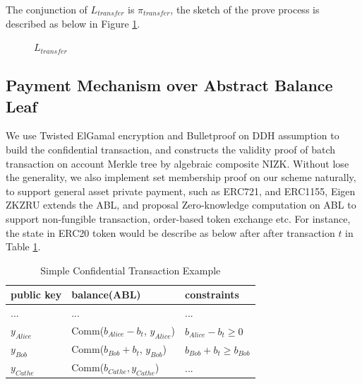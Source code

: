\documentclass{article}
\begin{document}
The conjunction of $L_{transfer}$ is $\pi_{transfer}$, the sketch of the prove process is described as below in Figure \ref{fig:pi_transfer}.
\begin{figure}[H]
    \centering
    \caption{${L_{transfer}}$}
    \label{fig:pi_transfer}
\end{figure}

\subsection{Payment Mechanism over Abstract Balance Leaf} \label{section:pay-abl}

We use Twisted ElGamal encryption \cite{chen2020pgc} and Bulletproof \cite{bunz2018bulletproofs} on DDH assumption to build the confidential transaction, and constructs the validity proof of batch transaction on account Merkle tree by algebraic composite NIZK. Without lose the generality, we also implement set membership proof on our scheme naturally, to support general asset private payment, such as ERC721, and ERC1155, Eigen ZKZRU extends the ABL, and proposal Zero-knowledge computation on ABL to support non-fungible transaction, order-based token exchange etc. For instance, the state in ERC20 token would be describe as below after after transaction $t$ in Table \ref{tab:transfer}. 

\begin{table}
\centering
\begin{tabular}{l|l|l}
public key & balance(ABL) & constraints \\
\hline
... & ... & ...  \\
\hline
$y_{Alice}$  & Comm($b_{Alice} - b_t$, $y_{Alice}$) & $b_{Alice} - b_t \ge 0$ \\
\hline
$y_{Bob}$  & Comm($b_{Bob} + b_t$, $y_{Bob}$) & $b_{Bob} + b_t \ge b_{Bob} $  \\
\hline
$y_{Cathe}$  & Comm($b_{Cathe}, y_{Cathe}$) & ...   \\
\end{tabular}
\caption{\label{tab:transfer}Simple Confidential Transaction Example}
\end{table}
\end{document}
